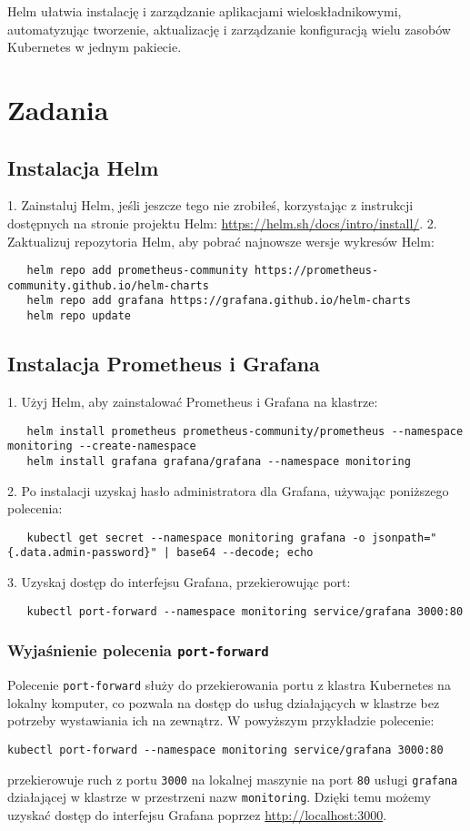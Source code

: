 \documentclass{article}
\begin{document}
Helm ułatwia instalację i zarządzanie aplikacjami wieloskładnikowymi, automatyzując tworzenie, aktualizację i zarządzanie konfiguracją wielu zasobów Kubernetes w jednym pakiecie.

\section{Zadania}

\subsection{Instalacja Helm}
1. Zainstaluj Helm, jeśli jeszcze tego nie zrobiłeś, korzystając z instrukcji dostępnych na stronie projektu Helm: \url{https://helm.sh/docs/intro/install/}.
2. Zaktualizuj repozytoria Helm, aby pobrać najnowsze wersje wykresów Helm:
   \begin{lstlisting}
   helm repo add prometheus-community https://prometheus-community.github.io/helm-charts
   helm repo add grafana https://grafana.github.io/helm-charts
   helm repo update
   \end{lstlisting}

\subsection{Instalacja Prometheus i Grafana}
1. Użyj Helm, aby zainstalować Prometheus i Grafana na klastrze:
   \begin{lstlisting}
   helm install prometheus prometheus-community/prometheus --namespace monitoring --create-namespace
   helm install grafana grafana/grafana --namespace monitoring
   \end{lstlisting}
2. Po instalacji uzyskaj hasło administratora dla Grafana, używając poniższego polecenia:
   \begin{lstlisting}
   kubectl get secret --namespace monitoring grafana -o jsonpath="{.data.admin-password}" | base64 --decode; echo
   \end{lstlisting}
3. Uzyskaj dostęp do interfejsu Grafana, przekierowując port:
   \begin{lstlisting}
   kubectl port-forward --namespace monitoring service/grafana 3000:80
   \end{lstlisting}

\subsubsection{Wyjaśnienie polecenia \texttt{port-forward}}
Polecenie \texttt{port-forward} służy do przekierowania portu z klastra Kubernetes na lokalny komputer, co pozwala na dostęp do usług działających w klastrze bez potrzeby wystawiania ich na zewnątrz. W powyższym przykładzie polecenie:
\begin{lstlisting}
kubectl port-forward --namespace monitoring service/grafana 3000:80
\end{lstlisting}
przekierowuje ruch z portu \texttt{3000} na lokalnej maszynie na port \texttt{80} usługi \texttt{grafana} działającej w klastrze w przestrzeni nazw \texttt{monitoring}. Dzięki temu możemy uzyskać dostęp do interfejsu Grafana poprzez \url{http://localhost:3000}.
\end{document}
